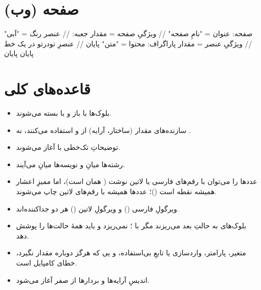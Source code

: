 \section{صفحه (وب)}

\begin{salamfa}
صفحه:
    عنوان = "نامِ صفحه"                  // ویژگیِ صفحه = مقدار
    جعبه:                                // عنصر
        رنگ = "آبی"                        // ویژگیِ عنصر = مقدار
        پاراگراف: محتوا = "متن" پایان     // عنصرِ تودرتو در یک خط
    پایان
پایان
\end{salamfa}

\section{قاعده‌های کلی}

\begin{itemize}
  \item بلوک‌ها با \code{:} باز و با  بسته می‌شوند.
  \item سازنده‌های مقدار (ساختار، آرایه) از \code{\{\,\}} و \code{[\,]} استفاده
        می‌کنند، نه .
  \item توضیحاتِ تک‌خطی با \code{//} آغاز می‌شوند.
  \item رشته‌ها میانِ  و نویسه‌ها میانِ  می‌آیند.
  \item عددها را می‌توان با رقم‌های فارسی یا لاتین نوشت ( همان
         است)، اما ممیزِ اعشار همیشه نقطه است ()؛ عددها
        همیشه با رقم‌های لاتین چاپ می‌شوند.
  \item ویرگولِ فارسی () و ویرگولِ لاتین (\code{,}) هر دو جداکننده‌اند.
  \item بلوک‌های  به حالتِ بعد می‌ریزند مگر با ؛
         نمی‌ریزد و باید همهٔ حالت‌ها را پوشش دهد.
  \item متغیر، پارامتر، واردسازی یا تابعِ بی‌استفاده، و یی که هرگز
        دوباره مقدار نگیرد، خطای کامپایل است.
  \item اندیسِ آرایه‌ها و بردارها از صفر آغاز می‌شود.
\end{itemize}
